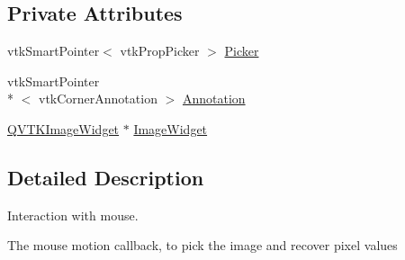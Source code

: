 \subsection*{Private Attributes}
\begin{DoxyCompactItemize}
\item 
vtk\-Smart\-Pointer$<$ vtk\-Prop\-Picker $>$ \hyperlink{class_q_v_t_k_image_widget_command_a1fd828efb713d093b8ddd54106173026}{Picker}
\item 
vtk\-Smart\-Pointer\\*
$<$ vtk\-Corner\-Annotation $>$ \hyperlink{class_q_v_t_k_image_widget_command_acf94b139e36f7523e43a982777e7e4fc}{Annotation}
\item 
\hyperlink{class_q_v_t_k_image_widget}{Q\-V\-T\-K\-Image\-Widget} $\ast$ \hyperlink{class_q_v_t_k_image_widget_command_a2d5134d4197ace65e78faf4d1dbbe30c}{Image\-Widget}
\end{DoxyCompactItemize}


\subsection{Detailed Description}
Interaction with mouse. 

The mouse motion callback, to pick the image and recover pixel values 

